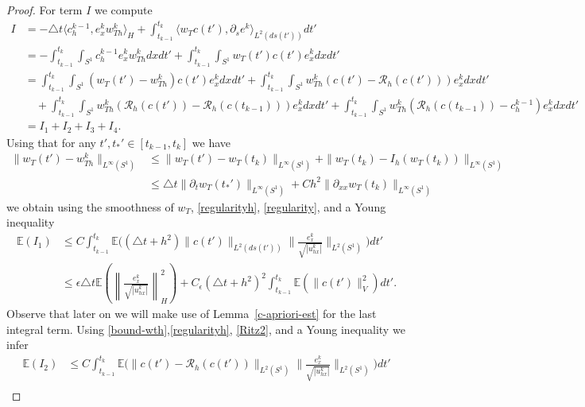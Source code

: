 \documentclass[a4paper,10pt]{article}
\numberwithin{equation}{section}
\begin{document}
\begin{proof}
For term $I$ we compute
\begin{align*}
I&= -\triangle t \langle c^{k-1}_{h}, e_{x}^{k} w_{Th}^{k} \rangle_{H}
+ \int_{t_{k-1}}^{t_{k}} \langle w_{T} c(t'), \partial_{s} e^{k} \rangle_{L^{2} (ds(t'))} dt' \\
& = -\int_{t_{k-1}}^{t_{k}} \int_{S^{1}} c^{k-1}_{h} e_{x}^{k} w_{Th}^{k} dx dt' + \int_{t_{k-1}}^{t_{k}} \int_{S^{1}} w_{T} (t') c(t') e^{k}_{x} dx dt'\\
&= \int_{t_{k-1}}^{t_{k}} \int_{S^{1}} (w_{T}(t') -w_{Th}^{k}) c(t') e^{k}_{x} dx dt'
+ \int_{t_{k-1}}^{t_{k}} \int_{S^{1}} w_{Th}^{k} (c(t')- \mathcal{R}_{h}(c(t' )))e^{k}_{x} dx dt'\\
& \quad 
+ \int_{t_{k-1}}^{t_{k}} \int_{S^{1}} w_{Th}^{k} (\mathcal{R}_{h}(c(t' ))- \mathcal{R}_{h} (c(t_{k-1})) )e^{k}_{x} dx dt'
+ \int_{t_{k-1}}^{t_{k}} \int_{S^{1}} w_{Th}^{k} (\mathcal{R}_{h} (c(t_{k-1})) - c^{k-1}_{h} )e^{k}_{x} dx dt'\\
&= I_{1}+I_{2}+I_{3}+I_{4}.
\end{align*}
Using that for any $t', t_{*}' \in [t_{k-1}, t_{k}]$ we have
\begin{align*}
\| w_{T}(t') -w_{Th}^{k}\|_{L^{\infty}(S^{1})} &\leq \| w_{T}(t') - w_{T}(t_{k})\|_{L^{\infty}(S^{1})} + \| w_{T}(t_{k}) -I_{h}( w_{T}(t_{k}))\|_{L^{\infty}(S^{1})} \\
& \leq \triangle t \| \partial_{t} w_{T}(t_{*}') \|_{L^{\infty}(S^{1})} + Ch^{2} \| \partial_{xx} w_{T}(t_{k}) \|_{L^{\infty}(S^{1})}
\end{align*}
we obtain using the smoothness of $w_{T}$, \eqref{regularityh}, \eqref{regularity}, and a Young inequality
\begin{align*}
\mathbb{E}(I_{1}) &\leq C \int_{t_{k-1}}^{t_{k}} \mathbb{E} \Big( (\triangle t + h^{2}) \| c(t') \|_{L^{2}(ds(t'))} \big \| \frac{e^{k}_{x}}{\sqrt{|u^{k}_{hx}|}} \big \|_{L^{2}(S^{1})} \Big) dt'\\
&
\leq \epsilon \triangle t \mathbb{E} \left (\left \| \frac{e_{x}^{k}}{\sqrt{|u^{k}_{hx}| } } \right \| ^{2}_{H} \right) + C_{\epsilon}(\triangle t + h^{2})^{2} \int_{t_{k-1}}^{t_{k}}\mathbb{E} (\| c(t')\|^{2}_{V} )dt'.
\end{align*}
Observe that later on we will make use of Lemma~\ref{c-apriori-est} for the last integral term.
Using \eqref{bound-wth},\eqref{regularityh}, \eqref{Ritz2}, and a Young inequality
 we infer
\begin{align*}
\mathbb{E}(I_{2}) &\leq C \int_{t_{k-1}}^{t_{k}} \mathbb{E} \Big( \| c(t')- \mathcal{R}_{h}(c(t'))\|_{L^{2}(S^{1})} \| \frac{e^{k}_{x}}{\sqrt{|u^{k}_{hx}|}}\|_{L^{2}(S^{1})} \Big) dt'\\

\end{align*}
\end{proof}
\end{document}
